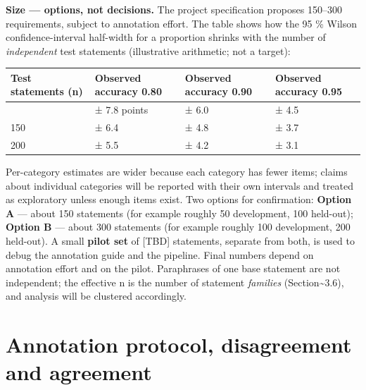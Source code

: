 \documentclass[
  11pt,a4paper,oneside]{report}
\begin{document}
\textbf{Size --- options, not decisions.} The project specification
proposes 150--300 requirements, subject to annotation effort. The table
shows how the 95 \% Wilson confidence-interval half-width for a
proportion shrinks with the number of \emph{independent} test statements
(illustrative arithmetic; not a target):

\begin{longtable}[]{@{}p{\dimexpr(\linewidth-8\tabcolsep)/4\relax}p{\dimexpr(\linewidth-8\tabcolsep)/4\relax}p{\dimexpr(\linewidth-8\tabcolsep)/4\relax}p{\dimexpr(\linewidth-8\tabcolsep)/4\relax}@{}}
\toprule\noalign{}
Test statements (n) & Observed accuracy 0.80 & Observed accuracy 0.90 &
Observed accuracy 0.95 \\
\midrule\noalign{}
\endhead
\bottomrule\noalign{}
\endlastfoot
100 & ± 7.8 points & ± 6.0 & ± 4.5 \\
150 & ± 6.4 & ± 4.8 & ± 3.7 \\
200 & ± 5.5 & ± 4.2 & ± 3.1 \\
\end{longtable}

Per-category estimates are wider because each category has fewer items;
claims about individual categories will be reported with their own
intervals and treated as exploratory unless enough items exist. Two
options for confirmation: \textbf{Option A} --- about 150 statements
(for example roughly 50 development, 100 held-out); \textbf{Option B}
--- about 300 statements (for example roughly 100 development, 200
held-out). A small \textbf{pilot set} of {[}TBD{]} statements, separate
from both, is used to debug the annotation guide and the pipeline. Final
numbers depend on annotation effort and on the pilot. Paraphrases of one
base statement are not independent; the effective n is the number of
statement \emph{families} (Section\textasciitilde3.6), and analysis will
be clustered accordingly.

\hypertarget{annotation-protocol-disagreement-and-agreement}{%
\section{Annotation protocol, disagreement and
agreement}\label{annotation-protocol-disagreement-and-agreement}}
\end{document}
